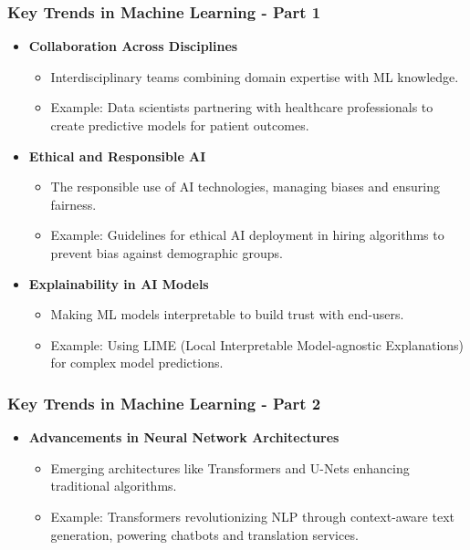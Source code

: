 \documentclass[aspectratio=169]{beamer}
\begin{document}
\begin{frame}[fragile]
    \frametitle{Key Trends in Machine Learning - Part 1}
    \begin{itemize}
        \item \textbf{Collaboration Across Disciplines}
            \begin{itemize}
                \item Interdisciplinary teams combining domain expertise with ML knowledge.
                \item Example: Data scientists partnering with healthcare professionals to create predictive models for patient outcomes.
            \end{itemize}
        
        \item \textbf{Ethical and Responsible AI}
            \begin{itemize}
                \item The responsible use of AI technologies, managing biases and ensuring fairness.
                \item Example: Guidelines for ethical AI deployment in hiring algorithms to prevent bias against demographic groups.
            \end{itemize}
        
        \item \textbf{Explainability in AI Models}
            \begin{itemize}
                \item Making ML models interpretable to build trust with end-users.
                \item Example: Using LIME (Local Interpretable Model-agnostic Explanations) for complex model predictions.
            \end{itemize}
    \end{itemize}
\end{frame}

\begin{frame}[fragile]
    \frametitle{Key Trends in Machine Learning - Part 2}
    \begin{itemize}
        \item \textbf{Advancements in Neural Network Architectures}
            \begin{itemize}
                \item Emerging architectures like Transformers and U-Nets enhancing traditional algorithms.
                \item Example: Transformers revolutionizing NLP through context-aware text generation, powering chatbots and translation services.
            \end{itemize}
    \end{itemize}
\end{frame}
\end{document}
